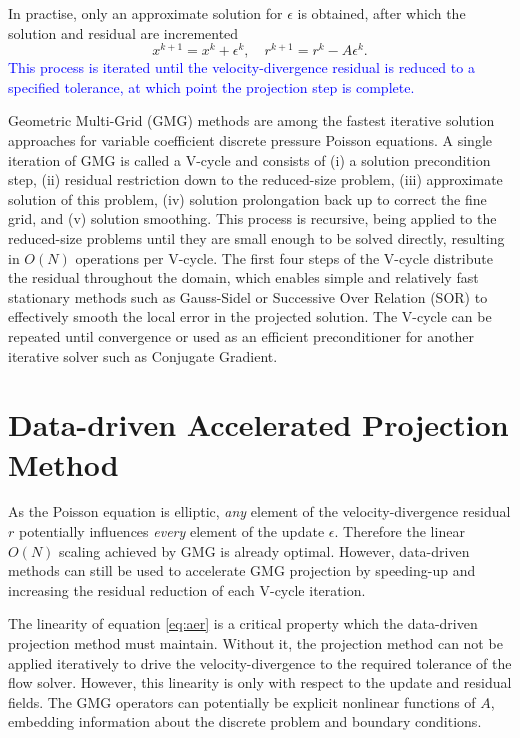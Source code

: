 \documentclass[review]{elsarticle}
\begin{document}
In practise, only an approximate solution for $\epsilon$ is obtained, after which the solution and residual are incremented
\begin{equation}\label{eq:increment}
    x^{k+1} = x^k+\epsilon^k, \quad r^{k+1} = r^k-A\epsilon^k.
\end{equation}
\textcolor{blue}{This process is iterated until the velocity-divergence residual is reduced to a specified tolerance, at which point the projection step is complete.}

Geometric Multi-Grid (GMG) methods are among the fastest iterative solution approaches for variable coefficient discrete pressure Poisson equations. A single iteration of GMG is called a V-cycle and consists of (i) a solution precondition step, (ii) residual restriction down to the reduced-size problem, (iii) approximate solution of this problem, (iv) solution prolongation back up to correct the fine grid, and (v) solution smoothing. This process is recursive, being applied to the reduced-size problems until they are small enough to be solved directly, resulting in $O(N)$ operations per V-cycle.
The first four steps of the V-cycle distribute the residual throughout the domain, which enables simple and relatively fast stationary methods such as Gauss-Sidel or Successive Over Relation (SOR) to effectively smooth the local error in the projected solution. The V-cycle can be repeated until convergence or used as an efficient preconditioner for another iterative solver such as Conjugate Gradient. 

\section{Data-driven Accelerated Projection Method}

As the Poisson equation is elliptic, \textit{any} element of the velocity-divergence residual $r$ potentially influences \textit{every} element of the update $\epsilon$. Therefore the linear $O(N)$ scaling achieved by GMG is already optimal. However, data-driven methods can still be used to accelerate GMG projection by speeding-up and increasing the residual reduction of each V-cycle iteration.

The linearity of equation \ref{eq:aer} is a critical property which the data-driven projection method must maintain. Without it, the projection method can not be applied iteratively to drive the velocity-divergence to the required tolerance of the flow solver. However, this linearity is only with respect to the update and residual fields. The GMG operators can potentially be explicit nonlinear functions of $A$, embedding information about the discrete problem and boundary conditions. 
\end{document}
